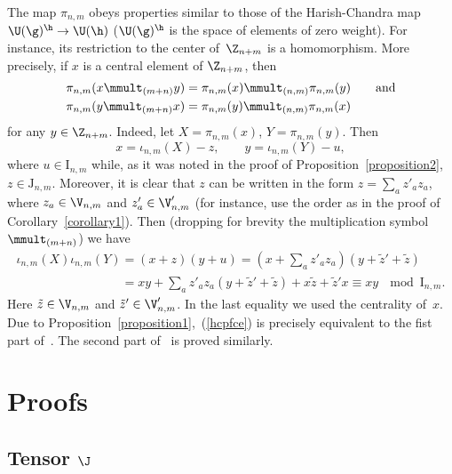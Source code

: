 \documentclass[pdftex]{sigma}
\numberwithin{equation}{section}
\begin{document}
The map $\pi_{n,m}$ obeys properties similar to those of the Harish-Chandra map $\U(\g)^{\h}\to \U(\h)$ ($\U(\g)^{\h}$ is the space of elements of zero
weight). For instance, its restriction to the center of~$\Z_{n+m}$ is a homomorphism. More precisely, if $x$ is a central element of $\Z_{n+m}$, then
\begin{gather}
\begin{split}
&   \pi_{n,m}(x\mmult_{(m+n)}y)=\pi_{n,m}(x) \mmult_{(n,m)}\pi_{n,m}(y)\qquad \text{and}\\ %
& \pi_{n,m}(y\mmult_{(m+n)}x)=\pi_{n,m}(y) \mmult_{(n,m)}\pi_{n,m}(x)
\end{split} \label{st5bis}
\end{gather}
for any $y\in\Z_{n+m}$. Indeed, let $X=\pi_{n,m}(x)$, $Y=\pi_{n,m}(y)$. Then
\[
x=\iota_{n,m}(X)-z  ,\qquad y=\iota_{n,m}(Y)-u  ,
\]
where $u\in  \mathrm{I}_{n,m}$ while, as it was noted in the proof of Proposition~\ref{proposition2}, $z\in  \mathrm{J}_{n,m}$.
Moreover, it is clear that $z$ can be written in the form $z=\sum_az'_az^{\phantom{'}}_a$, where $z_a\in\V_{n,m}$ and $z'_a\in\V'_{n,m}$ (for instance,
use the order as in the proof of Corollary~\ref{corollary1}). Then (dropping for brevity the multiplication symbol $\mmult_{(m+n)}$) we have
\begin{gather}
 \iota_{n,m}(X)\iota_{n,m}(Y)= (x+z)(y+u)
 =\left(x+\sum_az'_az^{\phantom{'}}_a\right)(y+\tilde{z}'+\tilde{z})\nonumber\\
\phantom{\iota_{n,m}(X)\iota_{n,m}(Y)}{}
 =xy+\sum_a z'_az^{\phantom{'}}_a(y+\tilde{z}'+
\tilde{z})+x\tilde{z}+\tilde{z}'x  \equiv  xy\ \mod \mathrm{I}_{n,m}  .\label{hcpfce}
\end{gather}
Here $\tilde{z}\in\V_{n,m}$ and $\tilde{z}' \in\V'_{n,m}$. In the last equality we used the centrality of~$x$. Due to Proposi\-tion~\ref{proposition1},~(\ref{hcpfce}) is
precisely equivalent to the f\/ist part of~. The second part of~ is proved similarly.

\section{Proofs}\label{sectionproofs}


\subsection[Tensor $\J$]{Tensor $\boldsymbol{\J}$}\label{sectionJ}
\end{document}
